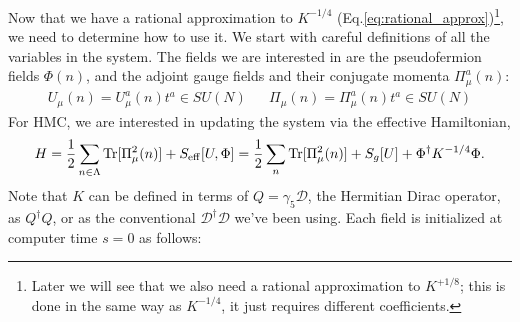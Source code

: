 
Now that we have a rational approximation to $K^{-1/4}$ (Eq.\eqref{eq:rational_approx})\footnote{Later we will see that we also need a rational approximation to $K^{+1/8}$; this is done in the same way as $K^{-1/4}$, it just requires different coefficients. }, we need to determine how to use it. We start with careful definitions of all the variables in the system. The fields we are interested in are the pseudofermion fields $\Phi(n)$, and the adjoint gauge fields and their conjugate momenta $\Pi_\mu^a(n)$:
\begin{align}
	U_\mu(n) = U_\mu^a(n) t^a \in SU(N) && \Pi_\mu(n) = \Pi_\mu^a(n) t^a\in SU(N)
\end{align}
For HMC, we are interested in updating the system via the effective Hamiltonian,
\begin{equation}
	H = \frac{1}{2} \sum_{n\in\Lambda} \mathrm{Tr} [\Pi_\mu^2(n)] + S_\mathrm{eff}[U, \Phi] = \frac{1}{2} \sum_n \mathrm{Tr} [\Pi_\mu^2(n)] + S_g[U] + \Phi^\dagger K^{-1/4} \Phi.
\end{equation}
Note that $K$ can be defined in terms of $Q = \gamma_5 \mathcal D$, the Hermitian Dirac operator, as $Q^\dagger Q$, or as the conventional $\mathcal D^\dagger \mathcal D$ we've been using. Each field is initialized at computer time $s = 0$ as follows:
